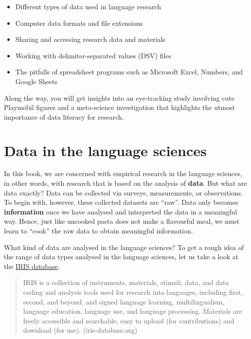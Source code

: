 \documentclass[
  letterpaper,
  DIV=11,
  numbers=noendperiod]{scrreprt}
\providecommand{\tightlist}{%
  \setlength{\itemsep}{0pt}\setlength{\parskip}{0pt}}
\begin{document}
\begin{itemize}
\tightlist
\item
  Different types of data used in language research
\item
  Computer data formats and file extensions
\item
  Sharing and accessing research data and materials
\item
  Working with delimiter-separated values (DSV) files
\item
  The pitfalls of spreadsheet programs such as Microsoft Excel, Numbers,
  and Google Sheets
\end{itemize}

Along the way, you will get insights into an eye-tracking study
involving cute Playmobil figures and a meta-science investigation that
highlights the utmost importance of data literacy for research.

\section{Data in the language sciences}\label{sec-DataLanguageSciences}

In this book, we are concerned with empirical research in the language
sciences, in other words, with research that is based on the analysis of
\textbf{data}. But what are data exactly? Data can be collected via
surveys, measurements, or observations. To begin with, however, these
collected datasets are ``raw''. Data only becomes \textbf{information}
once we have analysed and interpreted the data in a meaningful way.
Hence, just like uncooked pasta does not make a flavourful meal, we must
learn to ``cook'' the raw data to obtain meaningful information.

What kind of data are analysed in the language sciences? To get a rough
idea of the range of data types analysed in the language sciences, let
us take a look at the \href{https://iris-database.org}{IRIS database}.

\begin{quote}
IRIS is a collection of instruments, materials, stimuli, data, and data
coding and analysis tools used for research into languages, including
first, second, and beyond, and signed language learning,
multilingualism, language education, language use, and language
processing. Materials are freely accessible and searchable, easy to
upload (for contributions) and download (for use). ({iris-database.org})
\end{quote}
\end{document}
